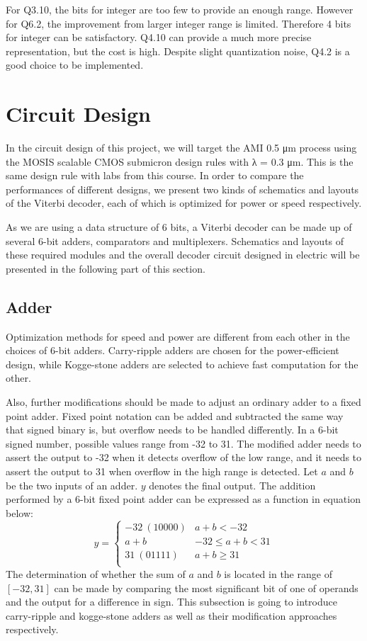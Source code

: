 \documentclass[conference]{IEEEtran}
\begin{document}
For Q3.10, the bits for integer are too few to provide an enough range. However for Q6.2, the improvement from larger integer range is limited. Therefore 4 bits for integer can be satisfactory. Q4.10 can provide a much more precise representation, but the cost is high. Despite slight quantization noise, Q4.2 is a good choice to be implemented.
\section{Circuit Design}
In the circuit design of this project, we will target the AMI 0.5 μm process using the MOSIS scalable CMOS submicron design rules with λ = 0.3 μm. This is the same design rule with labs from this course. In order to compare the performances of different designs, we present two kinds of schematics and layouts of the Viterbi decoder, each of which is optimized for power or speed respectively.

As we are using a data structure of 6 bits, a Viterbi decoder can be made up of several 6-bit adders, comparators and multiplexers. Schematics and layouts of these required modules and the overall decoder circuit designed in electric will be presented in the following part of this section.

\subsection{Adder}
Optimization methods for speed and power are different from each other in the choices of 6-bit adders. Carry-ripple adders are chosen for the power-efficient design, while Kogge-stone adders are selected to achieve fast computation for the other.

Also, further modifications should be made to adjust an ordinary adder to a fixed point adder. Fixed point notation can be added and subtracted the same way that signed binary is, but overflow needs to be handled differently. In a 6-bit signed number, possible values range from -32 to 31. The modified adder needs to assert the output to -32 when it detects overflow of the low range, and it needs to assert the output to 31 when overflow in the high range is detected. Let $a$ and $b$ be the two inputs of an adder. $y$ denotes the final output. The addition performed by a 6-bit fixed point adder can be expressed as a function in equation below: 
\begin{equation}
y=
\begin{cases}
-32\ (10000) & a+b<-32\\
a+b& -32\leq a+b < 31\\
31\ (01111)& a+b\geq 31\\
\end{cases}
\end{equation}
The determination of whether the sum of $a$ and $b$ is located in the range of $[-32, 31]$ can be made by comparing the most significant bit of one of operands and the output for a difference in sign. This subsection is going to introduce carry-ripple and kogge-stone adders as well as their modification approaches respectively.
\end{document}
